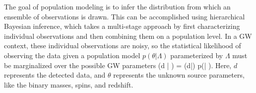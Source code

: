 \begin{refsection}


The goal of population modeling is to infer the distribution from which an ensemble of observations is drawn. This can be accomplished using hierarchical Bayesian inference, which takes a multi-stage approach by first characterizing individual observations and then combining them on a population level.
In a \ac{GW} context, these individual observations are noisy, so the statistical likelihood of observing the data given a population model $p(\theta | \Lambda)$ parameterized by $\Lambda$ must be marginalized over the possible \ac{GW} parameters \cite{Loredo_2004}
\beq
{}(d | \Lambda) = \thetaint {}(d|\theta) p(\theta | \Lambda).
\label{eq:marginalized_like}
\eeq
Here, $d$ represents the detected data, and $\theta$ represents the unknown source parameters, like the binary masses, spins, and redshift. 


\end{refsection}
